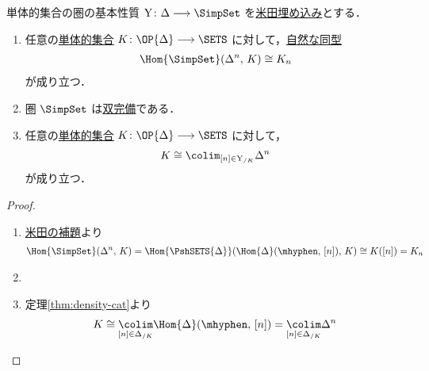 \documentclass[TQFT_main]{subfiles}
\begin{document}
\begin{myprop}[label=prop:SimpSet-basic]{単体的集合の圏の基本性質}
    $\mathrm{Y} \colon \Delta \lto \SimpSet$ を\hyperref[def:representable]{米田埋め込み}とする．
    \begin{enumerate}
        \item 任意の\hyperref[def:simplicial-sets]{単体的集合} $K \colon \OP{\Delta} \lto \SETS$ に対して，\hyperref[def:nat]{自然な同型}
        \begin{align}
            \Hom{\SimpSet} (\Delta^n,\, K) \cong K_n
        \end{align}
        が成り立つ．
        \item 圏 \hyperref[def:SimpSet]{$\SimpSet$} は\hyperref[def:complete]{双完備}である．
        \item 任意の\hyperref[def:simplicial-sets]{単体的集合} $K \colon \OP{\Delta} \lto \SETS$ に対して，
        \begin{align}
            K \cong \colim_{[n] \in \mathrm{Y}_{/K}} \Delta^n
        \end{align}
        が成り立つ．
    \end{enumerate}
    
\end{myprop}

\begin{proof}
    \begin{enumerate}
        \item \hyperref[lem:Yoneda]{米田の補題}より
        \begin{align}
            \Hom{\SimpSet} (\Delta^n,\, K) 
            =\Hom{\PshSETS{\Delta}} (\Hom{\Delta}(\mhyphen,\, [n]),\, K)
            \cong K([n]) = K_n
        \end{align}
        \item 
        \item 定理\ref{thm:density-cat}より
        \begin{align}
            K \cong \underset{[n] \in \Delta_{/K}}{\colim}\Hom{\Delta}(\mhyphen,\, [n]) = \underset{[n] \in \Delta_{/K}}{\colim} \Delta^n
        \end{align}
        
    \end{enumerate}
    
\end{proof}
\end{document}
